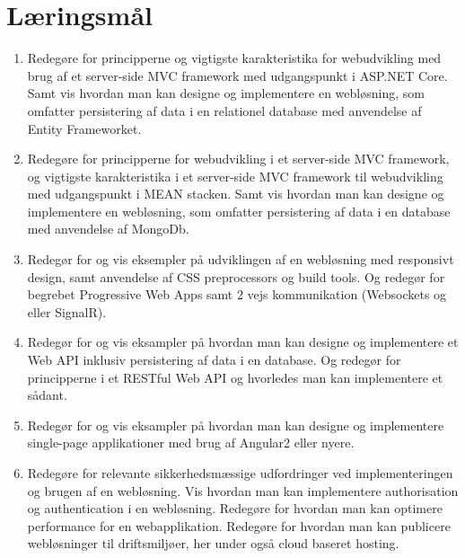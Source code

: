 \section*{Læringsmål}

\begin{enumerate}
	
	\item 
	Redegøre for principperne og vigtigste karakteristika for webudvikling med brug af et server-side MVC framework med udgangspunkt i ASP.NET Core. Samt vis hvordan man kan designe og implementere en	webløsning, som omfatter persistering af data i en relationel database med anvendelse af Entity Frameworket.
	
	\item 
	Redegøre for principperne for webudvikling i et server-side MVC framework, og vigtigste karakteristika i et server-side	MVC framework til webudvikling med udgangspunkt i MEAN stacken. Samt vis hvordan man kan designe og implementere en	webløsning, som omfatter persistering af data i en database	med anvendelse af MongoDb.
	
	\item 
	Redegør for og vis eksempler på udviklingen af en webløsning med responsivt design, samt anvendelse af CSS preprocessors og build tools. Og redegør for begrebet Progressive Web Apps samt 2 vejs	kommunikation (Websockets og eller SignalR).
	
	\item 
	Redegør for og vis eksampler på hvordan man kan designe	og implementere et Web API inklusiv persistering af data i en database. Og redegør for principperne i et RESTful Web API og	hvorledes man kan implementere et sådant.
		
	\item
	Redegør for og vis eksampler på hvordan man kan designe	og implementere single-page applikationer med brug af	Angular2 eller nyere.
	
	\item 
	Redegøre for relevante sikkerhedsmæssige udfordringer ved implementeringen og brugen af en webløsning. Vis hvordan man kan implementere authorisation og authentication i en webløsning.	Redegøre for hvordan man kan optimere performance for en webapplikation. Redegøre for hvordan man kan publicere webløsninger til driftsmiljøer, her under også cloud baseret hosting.
	
\end{enumerate}